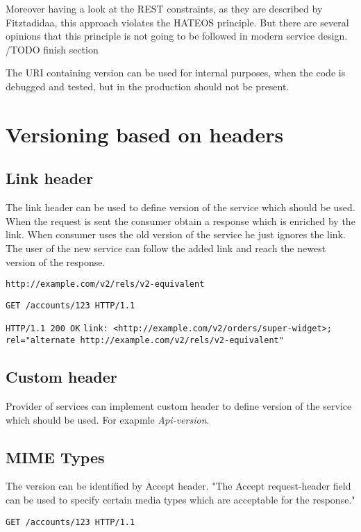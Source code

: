 Moreover having a look at the REST constraints, as they are described by Fitztadidaa, this approach violates the HATEOS principle. But there are several opinions that this principle is not going to be followed in modern service design. 
/TODO finish section 

The URI containing version can be used for internal purposes, when the code is debugged and tested, but in the production should not be present.

\section{Versioning based on headers}
\subsection{Link header}
The link header can be used to define version of the service which should be used. When the request is sent the consumer obtain a response which is enriched by the link. When consumer uses the old version of the service he just ignores the link. The user of the new service can follow the added link and reach the newest version of the response.

\texttt{http://example.com/v2/rels/v2-equivalent}

\texttt{GET /accounts/123 HTTP/1.1}

\texttt{HTTP/1.1 200 OK}
\texttt{link: <http://example.com/v2/orders/super-widget>; rel="alternate http://example.com/v2/rels/v2-equivalent"}

\subsection{Custom header}
Provider of services can implement custom header to define version of the service which should be used. For exapmle \emph{Api-version}.

\subsection{MIME Types}
The version can be identified by Accept header. "The Accept request-header field can be used to specify certain media types which are acceptable for the response." \cite{website:w3}

\texttt{GET /accounts/123 HTTP/1.1}


